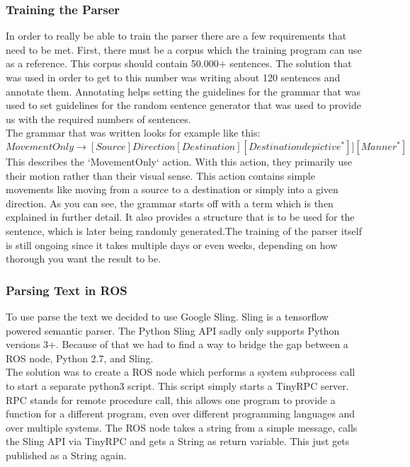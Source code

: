 \documentclass[main.tex]{subfiles}
\begin{document}
		\subsubsection{Training the Parser}
		In order to really be able to train the parser there are a few requirements that need to be met. First, there must be a corpus which the training program can use as a reference. This corpus should contain 50.000+ sentences. The solution that was used in order to get to this number was writing about 120 sentences and annotate them. Annotating helps setting the guidelines for the grammar that was used to set guidelines for the random sentence generator that was used to provide us with the required numbers of sentences.\\
		The grammar that was written looks for example like this:
		\begin{equation}
		MovementOnly \rightarrow [Source]Direction[Destination][Destinationdepictive^*]][Manner^*]
		\end{equation}		
		This describes the ‘MovementOnly‘ action. With this action, they primarily use their motion rather than their visual sense. This action contains simple movements like moving from a source to a destination or simply into a given direction.
		As you can see, the grammar starts off with a term which is then explained in further detail. It also provides a structure that is to be used for the sentence, which is later being randomly generated.The training of the parser itself is still ongoing since it takes multiple days or even weeks, depending on how thorough you want the result to be.
		
		\subsubsection{Parsing Text in ROS}
		To use parse the text we decided to use Google Sling. Sling is a tensorflow powered semantic parser. The Python Sling API sadly only supports Python versions 3+. Because of that we had to find a way to bridge the gap between a ROS node, Python 2.7, and Sling.\\
		The solution was to create a ROS node which performs a system subprocess call to start a separate python3 script. This script simply starts a TinyRPC server. RPC stands for remote procedure call, this allows one program to provide a function for a different program, even over different programming languages and over multiple systems. The ROS node takes a string from a simple message, calls the Sling API via TinyRPC and gets a String as return variable. This just gets published as a String again.
		
\end{document}
